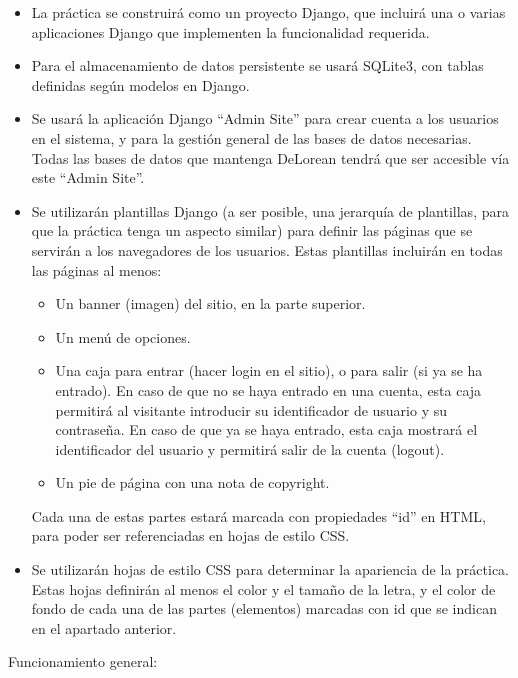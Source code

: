 \begin{itemize}

\item La práctica se construirá como un proyecto Django, que incluirá una o varias aplicaciones Django que implementen la funcionalidad requerida.

\item Para el almacenamiento de datos persistente se usará SQLite3, con tablas definidas según modelos en Django.

\item Se usará la aplicación Django ``Admin Site'' para crear cuenta a los usuarios en el sistema, y para la gestión general de las bases de datos necesarias. Todas las bases de datos que mantenga DeLorean tendrá que ser accesible vía este ``Admin Site''.

\item Se utilizarán plantillas Django (a ser posible, una jerarquía de plantillas, para que la práctica tenga un aspecto similar) para definir las páginas que se servirán a los navegadores de los usuarios. Estas plantillas incluirán en todas las páginas al menos:
  \begin{itemize}
  \item Un banner (imagen) del sitio, en la parte superior.
  \item Un menú de opciones.
  \item Una caja para entrar (hacer login en el sitio), o para salir (si ya se ha entrado). En caso de que no se haya entrado en una cuenta, esta caja permitirá al visitante introducir su identificador de usuario y su contraseña. En caso de que ya se haya entrado, esta caja mostrará el identificador del usuario y permitirá salir de la cuenta (logout).
  \item Un pie de página con una nota de copyright.
  \end{itemize}

Cada una de estas partes estará marcada con propiedades ``id'' en HTML, para poder ser referenciadas en hojas de estilo CSS.

\item Se utilizarán hojas de estilo CSS para determinar la apariencia de la práctica. Estas hojas definirán al menos el color y el tamaño de la letra, y el color de fondo de cada una de las partes (elementos) marcadas con id que se indican en el apartado anterior.
\end{itemize}

Funcionamiento general:

